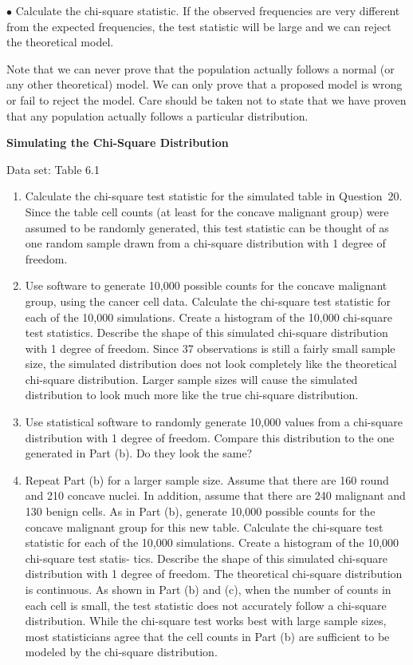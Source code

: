 \documentclass[
]{report}
\begin{document}
\begin{list}{E.}{ \setlength{\itemsep}{0.5em}}
\begin{enumerate}
  $\bullet$ Calculate the chi-square statistic. If the observed frequencies are very different from the expected frequencies, the test       statistic will be large and we can reject the theoretical model.
  
  Note that we can never prove that the population actually follows a normal (or any other theoretical)
  model. We can only prove that a proposed model is wrong or fail to reject the model. Care should be
  taken not to state that we have proven that any population actually follows a particular distribution.

  \end{enumerate}

  \item \textbf{Simulating the Chi-Square Distribution}    

  Data set: Table 6.1    
  
  \begin{enumerate}
    \item Calculate the chi-square test statistic for the simulated table in Question 20. Since the table cell counts (at least for the concave malignant group) were assumed to be randomly generated, this test statistic can be thought of as one random sample drawn from a chi-square distribution with 1 degree of freedom.
    \item Use software to generate 10,000 possible counts for the concave malignant group, using the cancer cell data. Calculate the chi-square test statistic for each of the 10,000 simulations. Create a histogram of the 10,000 chi-square test statistics. Describe the shape of this simulated chi-square distribution with 1 degree of freedom. Since 37 observations is still a fairly small sample size, the simulated distribution does not look completely like the theoretical chi-square distribution. Larger sample sizes will cause the simulated distribution to look much more like the true chi-square distribution.
    \item Use statistical software to randomly generate 10,000 values from a chi-square distribution with 1 degree of freedom. Compare this distribution to the one generated in Part (b). Do they look the same?
    \item Repeat Part (b) for a larger sample size. Assume that there are 160 round and 210 concave nuclei. In
addition, assume that there are 240 malignant and 130 benign cells. As in Part (b), generate 10,000
possible counts for the concave malignant group for this new table. Calculate the chi-square test
statistic for each of the 10,000 simulations. Create a histogram of the 10,000 chi-square test statis-
tics. Describe the shape of this simulated chi-square distribution with 1 degree of freedom.
The theoretical chi-square distribution is continuous. As shown in Part (b) and (c), when the
number of counts in each cell is small, the test statistic does not accurately follow a chi-square
distribution. While the chi-square test works best with large sample sizes, most statisticians agree
that the cell counts in Part (b) are sufficient to be modeled by the chi-square distribution.
  \end{enumerate}
  

\end{list}
\end{document}
